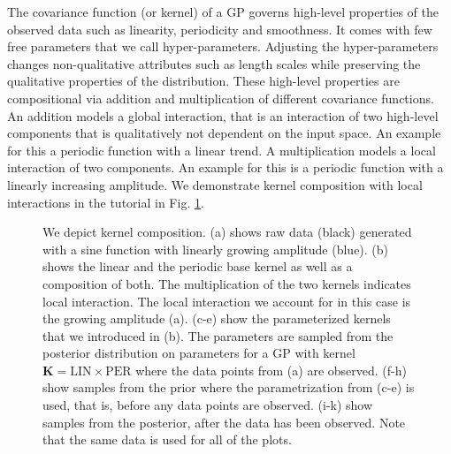 The covariance function (or kernel) of a \ac{GP} governs high-level properties of the observed data such as linearity, periodicity and smoothness.
It comes with few free parameters that we call hyper-parameters.
Adjusting the hyper-parameters changes non-qualitative attributes such as length
scales while preserving the qualitative properties of the distribution.
These high-level properties are compositional via addition and multiplication of different covariance functions. An addition models a global interaction, that is an interaction of two high-level components that is qualitatively not dependent on the input space. An example for this a periodic function with a linear trend.
A multiplication models a local interaction of two components. 
An example for this is a periodic function with a linearly increasing amplitude. We demonstrate kernel composition with local interactions in the tutorial in Fig. \ref{fig:composition_tutorial}. 


\begin{figure}

\caption{We depict kernel composition. 
(a) shows raw data (black) generated with a sine function with linearly growing amplitude (blue). 
(b) shows the linear and the periodic base kernel as well as a composition of both. 
The multiplication of the two kernels indicates local interaction. The local interaction we account for in this case is the growing amplitude (a). (c-e) show the parameterized kernels that we introduced in (b).
The parameters are sampled from the posterior distribution on parameters for a \ac{GP} with kernel $\mathbf{K}=\text{LIN} \times \text{PER}$ where the data points from (a) are observed.
(f-h) show samples from the prior where the parametrization from (c-e) is used, that is, before any data points are observed.
(i-k) show samples from the posterior, after the data has been observed. Note that the same data is used for all of the plots.}
\label{fig:composition_tutorial}
\end{figure}

